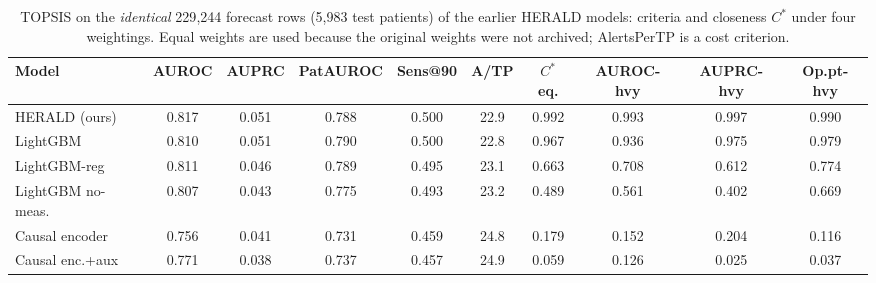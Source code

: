 \begin{table}[!t]
\centering\footnotesize\setlength{\tabcolsep}{3.4pt}
\caption{TOPSIS on the \emph{identical} 229{,}244 forecast rows (5{,}983 test patients) of the earlier HERALD models: criteria and closeness $C^*$ under four weightings. Equal weights are used because the original weights were not archived; AlertsPerTP is a cost criterion.}
\label{tab:topsis_models}
\begin{adjustbox}{max width=\linewidth}
\begin{tabular}{lccccccccc}
\toprule
Model & AUROC & AUPRC & PatAUROC & Sens@90 & A/TP & $C^*$ eq. & AUROC-hvy & AUPRC-hvy & Op.pt-hvy \\
\midrule
HERALD (ours) & 0.817 & 0.051 & 0.788 & 0.500 & 22.9 & 0.992 & 0.993 & 0.997 & 0.990 \\
LightGBM & 0.810 & 0.051 & 0.790 & 0.500 & 22.8 & 0.967 & 0.936 & 0.975 & 0.979 \\
LightGBM-reg & 0.811 & 0.046 & 0.789 & 0.495 & 23.1 & 0.663 & 0.708 & 0.612 & 0.774 \\
LightGBM no-meas. & 0.807 & 0.043 & 0.775 & 0.493 & 23.2 & 0.489 & 0.561 & 0.402 & 0.669 \\
Causal encoder & 0.756 & 0.041 & 0.731 & 0.459 & 24.8 & 0.179 & 0.152 & 0.204 & 0.116 \\
Causal enc.+aux & 0.771 & 0.038 & 0.737 & 0.457 & 24.9 & 0.059 & 0.126 & 0.025 & 0.037 \\
\bottomrule
\end{tabular}
\end{adjustbox}
\end{table}
